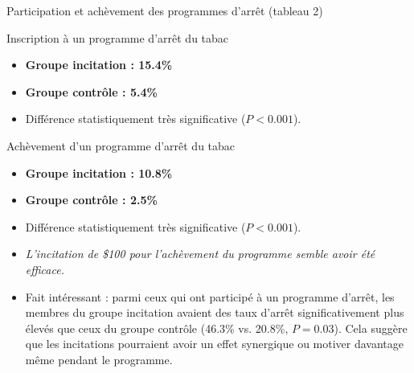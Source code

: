 \documentclass[aspectratio=169,xcolor=dvipsnames]{beamer}
\begin{document}
\begin{frame}{Participation et achèvement des programmes d'arrêt (tableau 2)}
    \begin{block}{Inscription à un programme d'arrêt du tabac}
        \begin{itemize}
            \item \textbf{Groupe incitation : 15.4\%}
            \item \textbf{Groupe contrôle : 5.4\%}
            \item Différence statistiquement très significative ($P<0.001$).
        \end{itemize}
    \end{block}
    \pause
    \begin{alertblock}{Achèvement d'un programme d'arrêt du tabac}
        \begin{itemize}
            \item \textbf{Groupe incitation : 10.8\%}
            \item \textbf{Groupe contrôle : 2.5\%}
            \item Différence statistiquement très significative ($P<0.001$).
            \item \textit{L'incitation de \$100 pour l'achèvement du programme semble avoir été efficace.}
        \end{itemize}
    \end{alertblock}
    \pause
    \begin{itemize}
        \item Fait intéressant : parmi ceux qui ont participé à un programme d'arrêt, les membres du groupe incitation avaient des taux d'arrêt significativement plus élevés que ceux du groupe contrôle (46.3\% vs. 20.8\%, $P=0.03$). Cela suggère que les incitations pourraient avoir un effet synergique ou motiver davantage même pendant le programme.
    \end{itemize}
\end{frame}
\end{document}
